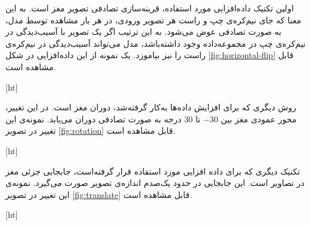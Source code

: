  اولین تکنیک داده‌افزایی مورد استفاده، قرینه‌سازی تصادفی تصویر مغز است.
 به این معنا که جای نیم‌کره‌ی چپ و راست هر تصویر ورودی، در هر بار مشاهده توسط مدل، به صورت تصادفی
 عوض می‌شود.
 به این ترتیب اگر یک تصویر با آسیب‌دیدگی در نیم‌کره‌ی چپ در مجموعه‌داده وجود داشته‌باشد، مدل می‌تواند آسیب‌دیدگی در نیم‌کره‌ی راست را نیز بیاموزد.
 یک نمونه از این داده‌افزایی در شکل \ref{fig:horizontal-flip} قابل مشاهده است.


[ht]

روش دیگری که برای افزایش داده‌ها به‌کار گرفته‌شد، دوران مغز است. در این 
تغییر، محور عمودی مغز بین $-30$ تا $30$ درجه به صورت تصادفی دوران می‌یابد.
نمونه‌ی این تغییر در تصویر \ref{fig:rotation}
قابل مشاهده است.


[ht]

تکنیک دیگری که برای داده افزایی مورد استفاده قرار گرفته‌است،
جابجایی جزئی مغز در تصاویر است.
این جابجایی در حدود یک‌صدم اندازه‌ی تصویر صورت می‌گیرد.
نمونه‌ی این تغییر در تصویر 
\ref{fig:translate}
قابل مشاهده است.


[ht]


